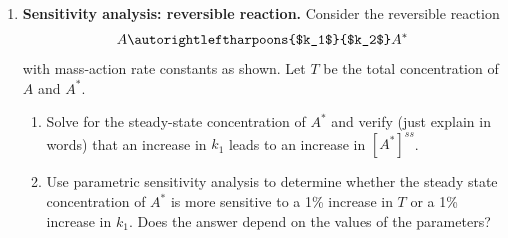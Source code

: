 \documentclass[12pt]{article}
\newcommand{\beqn}{\begin{eqnarray}}
\newcommand{\eeqn}{\end{eqnarray}}
\def \beqn {\begin{eqnarray*}}
\def \eeqn {\end{eqnarray*}}
\begin{document}
\begin{enumerate}
\item {\bf Sensitivity analysis: reversible reaction.} Consider the reversible reaction
\beqn
A \autorightleftharpoons{$k_1$}{$k_2$} A^*
\eeqn
with mass-action rate constants as shown.
Let $T$ be the total concentration of $A$ and $A^*$.  
\newline
\begin{enumerate}
\item Solve for the steady-state concentration of $A^*$ and verify (just explain in words) that an increase in $k_1$ leads to an increase in $[A^*]^{ss}$.

\item Use parametric sensitivity analysis to determine whether the steady state concentration of $A^*$ is more sensitive to a 1\% increase in $T$ or a 1\% increase in $k_1$.  Does the answer depend on the values of the parameters?
\end{enumerate}


\end{enumerate}
\end{document}
